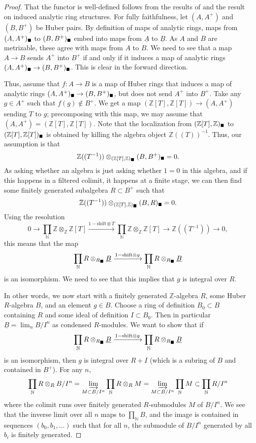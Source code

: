 \documentclass[11pt]{amsbook}
\newcommand{\solid}{{\mathsmaller{\blacksquare}}}
\numberwithin{equation}{section}
\numberwithin{theorem}{section}
\theoremstyle{definition}
\begin{document}
\begin{proof} That the functor is well-defined follows from the results of \cite{Condensed} and the result on induced analytic ring structures. For fully faithfulness, let $(A,A^+)$ and $(B,B^+)$ be Huber pairs. By definition of maps of analytic rings, maps from $(A,A^+)_\solid$ to $(B,B^+)_\solid$ embed into maps from $\underline{A}$ to $\underline{B}$. As $A$ and $B$ are metrizable, these agree with maps from $A$ to $B$. We need to see that a map $A\to B$ sends $A^+$ into $B^+$ if and only if it induces a map of analytic rings $(A,A^+)_\solid\to (B,B^+)_\solid$. This is clear in the forward direction.

Thus, assume that $f: A\to B$ is a map of Huber rings that induces a map of analytic rings $(A,A^+)_\solid\to (B,B^+)_\solid$, but does not send $A^+$ into $B^+$. Take any $g\in A^+$ such that $f(g)\not\in B^+$. We get a map $(\mathbb Z[T],\mathbb Z[T])\to (A,A^+)$ sending $T$ to $g$; precomposing with this map, we may assume that $(A,A^+)=(\mathbb Z[T],\mathbb Z[T])$. Note that the localization from $(\mathbb Z[T],\mathbb Z)_\solid$ to $(\mathbb Z[T],\mathbb Z[T])_\solid$ is obtained by killing the algebra object $\mathbb Z((T))^{-1}$. Thus, our assumption is that
\[
\mathbb Z((T^{-1}))\otimes_{(\mathbb Z[T],\mathbb Z)_\solid} (B,B^+)_\solid = 0.
\]
As asking whether an algebra is just asking whether $1=0$ in this algebra, and if this happens in a filtered colimit, it happens at a finite stage, we can then find some finitely generated subalgebra $R\subset B^+$ such that
\[
\mathbb Z((T^{-1}))\otimes_{(\mathbb Z[T],\mathbb Z)_\solid} (B,R)_\solid = 0.
\]
Using the resolution
\[
0\to \prod_{\mathbb N} \mathbb Z\otimes_{\mathbb Z} \mathbb Z[T]\xrightarrow{1-\mathrm{shift}\otimes T} \prod_{\mathbb N} \mathbb Z\otimes_{\mathbb Z} \mathbb Z[T]\to \mathbb Z((T^{-1}))\to 0,
\]
this means that the map
\[
\prod_{\mathbb N} R\otimes_{R_\solid} \underline{B}\xrightarrow{1-\mathrm{shift}\otimes g} \prod_{\mathbb N} R\otimes_{R_\solid} \underline{B}
\]
is an isomorphism. We need to see that this implies that $g$ is integral over $R$.

In other words, we now start with a finitely generated $\mathbb Z$-algebra $R$, some Huber $R$-algebra $B$, and an element $g\in B$. Choose a ring of definition $B_0\subset B$ containing $R$ and some ideal of definition $I\subset B_0$. Then in particular $\underline{B} = \lim_n B/I^n$ as condensed $R$-modules. We want to show that if
\[
\prod_{\mathbb N} R\otimes_{R_\solid} \underline{B}\xrightarrow{1-\mathrm{shift}\otimes g} \prod_{\mathbb N} R\otimes_{R_\solid} \underline{B}
\]
is an isomorphism, then $g$ is integral over $R+I$ (which is a subring of $B$ and contained in $B^+$). For any $n$,
\[
\prod_{\mathbb N} R\otimes_R B/I^n = \varinjlim_{M\subset B/I^n} \prod_{\mathbb N} R\otimes_R M = \varinjlim_{M\subset B/I^n} \prod_{\mathbb N} M\subset \prod_{\mathbb N} R/I^n
\]
where the colimit runs over finitely generated $R$-submodules $M$ of $B/I^n$. We see that the inverse limit over all $n$ maps to $\prod_{\mathbb N} B$, and the image is contained in sequences $(b_0,b_1,\ldots)$ such that for all $n$, the submodule of $B/I^n$ generated by all $b_i$ is finitely generated.


\end{proof}
\end{document}
